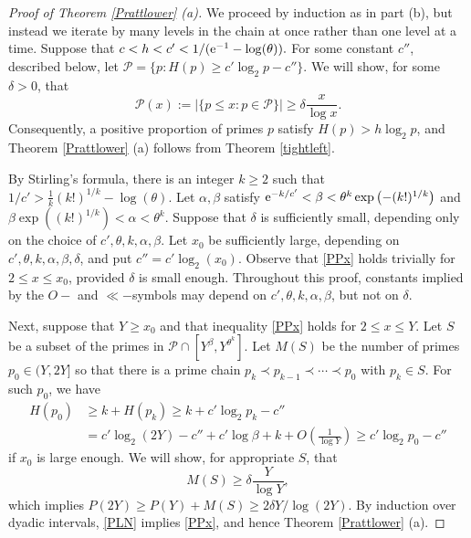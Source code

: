 \documentclass[12pt]{amsart}
\theoremstyle{remark}
\theoremstyle{plain}
\numberwithin{equation}{section}
\newcommand{\PP}{\mathcal{P}}   %
\newcommand{\be}{\begin{equation}}
\newcommand{\ee}{\end{equation}}
\renewcommand{\th}{\ensuremath{\theta}}
\renewcommand{\a}{\ensuremath{\alpha}}
\renewcommand{\b}{\ensuremath{\beta}}
\newcommand{\del}{\ensuremath{\delta}}
\renewcommand{\(}{\left(}
\renewcommand{\)}{\right)}
\newcommand{\pfrac}[2]{\left(\frac{#1}{#2}\right)}
\newcommand{\er}{{\rm e}}  %
\renewcommand{\le}{\leqslant}
\renewcommand{\ge}{\geqslant}
\begin{document}
\begin{proof}[Proof of Theorem \ref{Prattlower} (a)]
We proceed by induction as in part (b), but instead we iterate by
many levels in the chain at once rather than one level at a time.
Suppose that
$c < h < c' < 1/(\er^{-1} - \log(\th)).$
For some constant $c''$, described below, let
$\PP=\{p : H(p)\ge c'\log_2 p - c''\}.$
We will show, for some $\delta>0$, that
\be\label{PPx}
\PP(x) := | \{ p\le x : p\in \PP \}| \ge \delta \frac{x}{\log x}.
\ee
Consequently, a positive proportion of primes $p$ satisfy $H(p) > h
\log_2 p$, and Theorem \ref{Prattlower} (a) follows from Theorem \ref{tightleft}.

By Stirling's formula, there is
  an integer $k\ge 2$ such that
$1/c' > \frac{1}{k}(k!)^{1/k} - \log (\th)$.
Let $\a,\b$ satisfy
$\er^{-k/c'} < \b < \th^k \exp \( - (k!)^{1/k} \)$
and $\b \exp \( (k!)^{1/k} \) < \a < \th^k.$
Suppose that $\delta$ is sufficiently small, depending only on the
choice of $c', \th, k, \a, \b$.  Let $x_0$ be sufficiently large,
depending on $c', \th, k, \a, \b, \del$, and put $c'' = c' \log_2
(x_0)$. Observe that \eqref{PPx} holds trivially for $2 \le x \le
x_0$, provided $\del$ is small enough.  Throughout this proof,
constants implied by the $O-$ and $\ll-$symbols may depend on $c',
\th, k, \a, \b$, but not on $\del$.

Next, suppose that $Y\ge x_0$ and that inequality \eqref{PPx} holds for $2 \le
x\le Y$.  Let $S$ be a subset of the primes in $\mathcal{P} \cap
[Y^\b, Y^{\th^k}]$.
Let $M(S)$ be the number of primes $p_0\in (Y,2Y]$ so
that there is a prime chain
$p_k \prec p_{k-1} \prec \cdots \prec p_0$
with $p_k \in S$.  For such $p_0$, we have
\begin{align*}
H(p_0) &\ge k + H(p_k) 
\ge k + c'\log_2 p_k - c'' \\
&= c' \log_2 (2Y) - c'' + c' \log \b + k + O\pfrac{1}{\log Y}
\ge c'\log_2 p_0 - c''
\end{align*}
if $x_0$ is large enough.  We will show, for appropriate $S$, that
\be\label{PLN}
M(S) \ge \del \frac{Y}{\log Y},
\ee
which implies
$P(2Y) \ge P(Y) + M(S) \ge 2\del Y/\log (2Y).$
By induction over dyadic intervals, \eqref{PLN} implies
\eqref{PPx}, and hence Theorem \ref{Prattlower} (a).


\end{proof}
\end{document}
